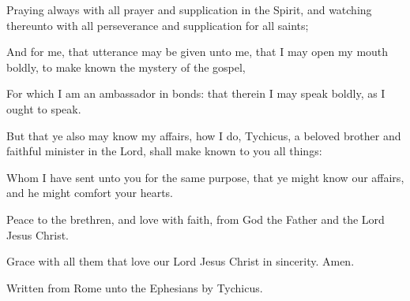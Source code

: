{Praying
always
with
all
prayer
and
supplication
in the
Spirit,
and
watching
thereunto
with
all
perseverance
and
supplication
for
all
saints;

And
for
me,
that
utterance may be
given
unto
me, that I may
open
my
mouth
boldly, to make
known the
mystery of the
gospel,

For
which I am an
ambassador
in
bonds:
that
therein I may speak
boldly,
as
I
ought to
speak.


\par }{\PP {}But
that
ye
also may
know
my
affairs,
{}
how I
do,
Tychicus, a
beloved
brother
and
faithful
minister
in the
Lord, shall make
known to
you all
things:

Whom I have
sent
unto
you
for the same
purpose,
that ye might
know
our
affairs,
and
{} he might
comfort
your
hearts.


\par }{\PP {}Peace
{} to the
brethren,
and
love
with
faith,
from
God the
Father
and the
Lord
Jesus
Christ.

Grace
{}
with
all them
that
love
our
Lord
Jesus
Christ
in
sincerity. Amen.


\par }{\SH Written from Rome unto the Ephesians by Tychicus.
\par }
